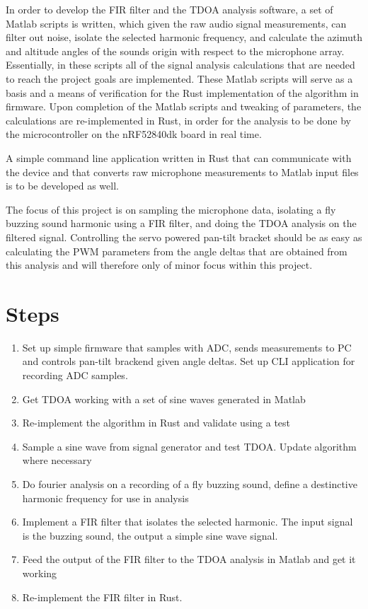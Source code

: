 \documentclass[a4paper]{article}
\begin{document}
In order to develop the FIR filter and the TDOA analysis software, a set of Matlab \cite{matlab} scripts is written, which given the raw audio signal measurements, can filter out noise, isolate the selected harmonic frequency, and calculate the azimuth and altitude angles of the sounds origin with respect to the microphone array. Essentially, in these scripts all of the signal analysis calculations that are needed to reach the project goals are implemented. These Matlab scripts will serve as a basis and a means of verification for the Rust implementation of the algorithm in firmware. Upon completion of the Matlab scripts and tweaking of parameters, the calculations are re-implemented in Rust, in order for the analysis to be done by the microcontroller on the nRF52840dk board in real time.

A simple command line application written in Rust that can communicate with the device and that converts raw microphone measurements to Matlab input files is to be developed as well.

The focus of this project is on sampling the microphone data, isolating a fly buzzing sound harmonic using a FIR filter, and doing the TDOA analysis on the filtered signal. Controlling the servo powered pan-tilt bracket should be as easy as calculating the PWM parameters from the angle deltas that are obtained from this analysis and will therefore only of minor focus within this project. 

\section{Steps}
\begin{enumerate}
    \item Set up simple firmware that samples with ADC, sends measurements to PC and controls pan-tilt brackend given angle deltas. Set up CLI application for recording ADC samples.
    \item Get TDOA working with a set of sine waves generated in Matlab
    \item Re-implement the algorithm in Rust and validate using a test
    \item Sample a sine wave from signal generator and test TDOA. Update algorithm where necessary
    \item Do fourier analysis on a recording of a fly buzzing sound, define a destinctive harmonic frequency for use in analysis
    \item Implement a FIR filter that isolates the selected harmonic. The input signal is the buzzing sound, the output a simple sine wave signal.
    \item Feed the output of the FIR filter to the TDOA analysis in Matlab and get it working
    \item Re-implement the FIR filter in Rust.
\end{enumerate}
\end{document}
